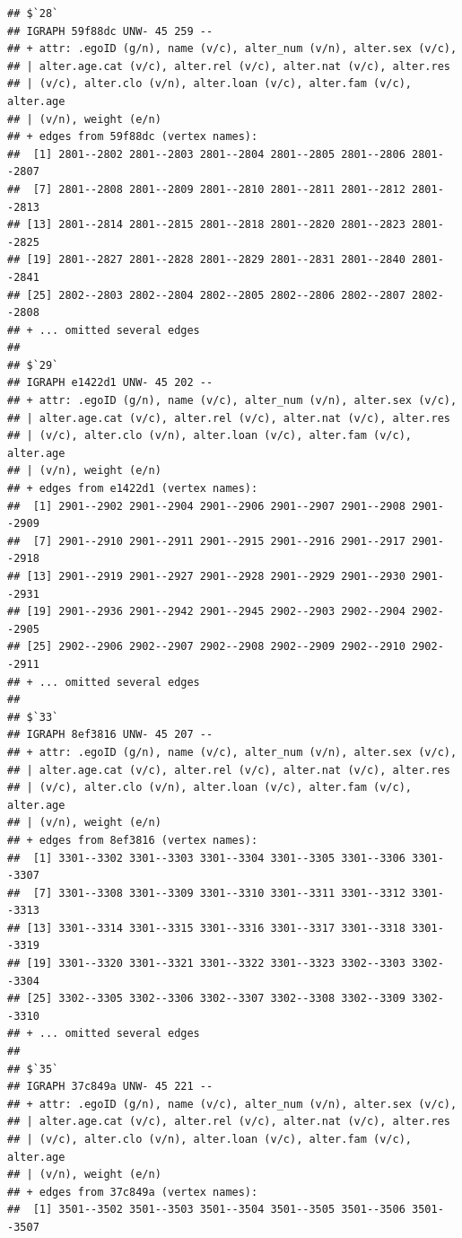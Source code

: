 \documentclass[
]{book}
\begin{document}
\begin{verbatim}
## $`28`
## IGRAPH 59f88dc UNW- 45 259 -- 
## + attr: .egoID (g/n), name (v/c), alter_num (v/n), alter.sex (v/c),
## | alter.age.cat (v/c), alter.rel (v/c), alter.nat (v/c), alter.res
## | (v/c), alter.clo (v/n), alter.loan (v/c), alter.fam (v/c), alter.age
## | (v/n), weight (e/n)
## + edges from 59f88dc (vertex names):
##  [1] 2801--2802 2801--2803 2801--2804 2801--2805 2801--2806 2801--2807
##  [7] 2801--2808 2801--2809 2801--2810 2801--2811 2801--2812 2801--2813
## [13] 2801--2814 2801--2815 2801--2818 2801--2820 2801--2823 2801--2825
## [19] 2801--2827 2801--2828 2801--2829 2801--2831 2801--2840 2801--2841
## [25] 2802--2803 2802--2804 2802--2805 2802--2806 2802--2807 2802--2808
## + ... omitted several edges
## 
## $`29`
## IGRAPH e1422d1 UNW- 45 202 -- 
## + attr: .egoID (g/n), name (v/c), alter_num (v/n), alter.sex (v/c),
## | alter.age.cat (v/c), alter.rel (v/c), alter.nat (v/c), alter.res
## | (v/c), alter.clo (v/n), alter.loan (v/c), alter.fam (v/c), alter.age
## | (v/n), weight (e/n)
## + edges from e1422d1 (vertex names):
##  [1] 2901--2902 2901--2904 2901--2906 2901--2907 2901--2908 2901--2909
##  [7] 2901--2910 2901--2911 2901--2915 2901--2916 2901--2917 2901--2918
## [13] 2901--2919 2901--2927 2901--2928 2901--2929 2901--2930 2901--2931
## [19] 2901--2936 2901--2942 2901--2945 2902--2903 2902--2904 2902--2905
## [25] 2902--2906 2902--2907 2902--2908 2902--2909 2902--2910 2902--2911
## + ... omitted several edges
## 
## $`33`
## IGRAPH 8ef3816 UNW- 45 207 -- 
## + attr: .egoID (g/n), name (v/c), alter_num (v/n), alter.sex (v/c),
## | alter.age.cat (v/c), alter.rel (v/c), alter.nat (v/c), alter.res
## | (v/c), alter.clo (v/n), alter.loan (v/c), alter.fam (v/c), alter.age
## | (v/n), weight (e/n)
## + edges from 8ef3816 (vertex names):
##  [1] 3301--3302 3301--3303 3301--3304 3301--3305 3301--3306 3301--3307
##  [7] 3301--3308 3301--3309 3301--3310 3301--3311 3301--3312 3301--3313
## [13] 3301--3314 3301--3315 3301--3316 3301--3317 3301--3318 3301--3319
## [19] 3301--3320 3301--3321 3301--3322 3301--3323 3302--3303 3302--3304
## [25] 3302--3305 3302--3306 3302--3307 3302--3308 3302--3309 3302--3310
## + ... omitted several edges
## 
## $`35`
## IGRAPH 37c849a UNW- 45 221 -- 
## + attr: .egoID (g/n), name (v/c), alter_num (v/n), alter.sex (v/c),
## | alter.age.cat (v/c), alter.rel (v/c), alter.nat (v/c), alter.res
## | (v/c), alter.clo (v/n), alter.loan (v/c), alter.fam (v/c), alter.age
## | (v/n), weight (e/n)
## + edges from 37c849a (vertex names):
##  [1] 3501--3502 3501--3503 3501--3504 3501--3505 3501--3506 3501--3507

\end{verbatim}
\end{document}
